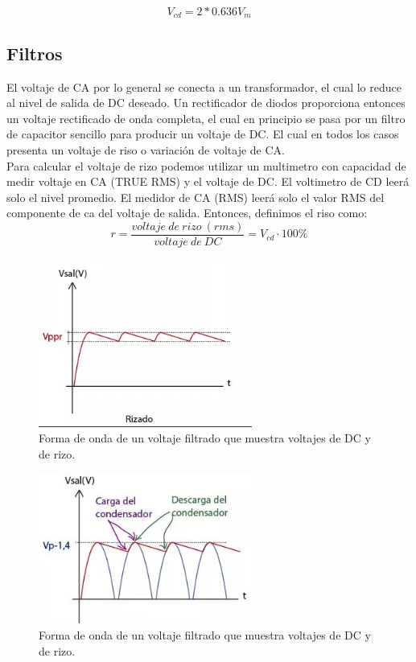 \begin{equation}\label{eq:ej}
V_{cd}=2*0.636V_{m}
\end{equation}


\subsection{Filtros}
El voltaje de CA por lo general se conecta a un transformador, el cual lo reduce al nivel de salida de DC deseado. Un rectificador de diodos proporciona entonces un voltaje rectificado de onda completa, el cual en principio se pasa por un filtro de capacitor sencillo para producir un voltaje de DC. El cual en todos los casos presenta un voltaje de riso o variación de voltaje de CA.\\

Para calcular el voltaje de rizo podemos utilizar un multimetro con capacidad de medir voltaje en CA (TRUE RMS) y el voltaje de DC. El voltimetro de CD leerá solo el nivel promedio. El medidor de CA (RMS) leerá solo el valor RMS del componente de ca del voltaje de salida. Entonces, definimos el riso como:\\

\begin{equation}
r=\frac{voltaje\:  de\:  rizo\:  (rms)}{voltaje\:  de\:  DC}=V_{cd}\cdot 100\%
\end{equation}

\begin{figure}[H]
\centering
\includegraphics[width=7cm]{capitulo3/figs/risado.png}
\caption{ Forma de onda de un voltaje filtrado que muestra voltajes de DC y de rizo.}
\end{figure}

\begin{figure}[H]
\centering
\includegraphics[width=7cm]{capitulo3/figs/filtro.png}
\caption{ Forma de onda de un voltaje filtrado que muestra voltajes de DC y de rizo.}
\end{figure}

